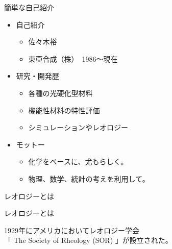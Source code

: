 \begin{frame}

\begin{block}{簡単な自己紹介}

\begin{itemize}
\tightlist
\item
  自己紹介

  \begin{itemize}
  \tightlist
  \item
    佐々木裕
  \item
    東亞合成（株）　1986～現在
  \end{itemize}
\item
  研究・開発歴

  \begin{itemize}
  \tightlist
  \item
    各種の光硬化型材料
  \item
    機能性材料の特性評価
  \item
    シミュレーションやレオロジー
  \end{itemize}
\item
  モットー

  \begin{itemize}
  \tightlist
  \item
    化学をベースに、尤もらしく。\\
  \item
    物理、数学、統計の考えを利用して。
  \end{itemize}
\end{itemize}

\end{block}

\end{frame}

\begin{frame}

\begin{block}{レオロジーとは}

\end{block}

\end{frame}

\begin{frame}

\begin{block}{レオロジーとは}

1929年にアメリカにおいてレオロジー学会\\
「 The Society of Rheology (SOR) 」が設立された。

\end{block}

\end{frame}

